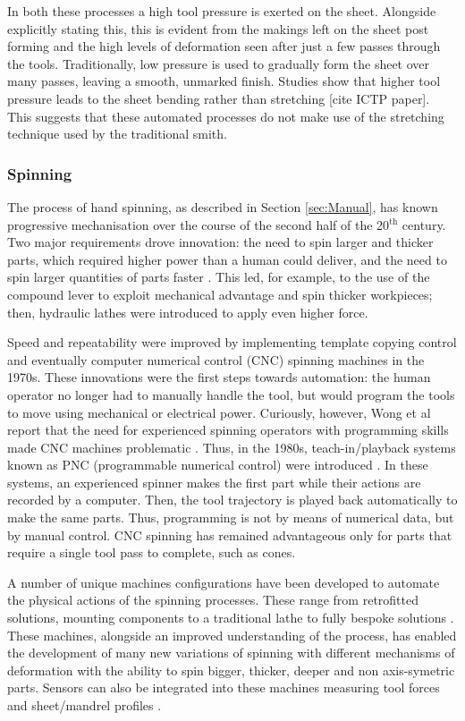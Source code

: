 In both these processes a high tool pressure is exerted on the sheet. Alongside explicitly stating this, this is evident from the makings left on the sheet post forming and the high levels of deformation seen after just a few passes through the tools. Traditionally, low pressure is used to gradually form the sheet over many passes, leaving a smooth, unmarked finish. Studies show that higher tool pressure leads to the sheet bending rather than stretching [cite ICTP paper]. This suggests that these automated processes do not make use of the stretching technique used by the traditional smith.


\subsubsection*{Spinning}

The process of hand spinning, as described in Section \ref{sec:Manual}, has known progressive mechanisation over the course of the second half of the 20$^{\text{th}}$ century. Two major requirements drove innovation: the need to spin larger and thicker parts, which required higher power than a human could deliver, and the need to spin larger quantities of parts faster \citep{Wong2003AProcesses}. This led, for example, to the use of the compound lever to exploit mechanical advantage and spin thicker workpieces; then, hydraulic lathes were introduced to apply even higher force. 

Speed and repeatability were improved by implementing template copying control and eventually computer numerical control (CNC) spinning machines in the 1970s. These innovations were the first steps towards automation: the human operator no longer had to manually handle the tool, but would program the tools to move using mechanical or electrical power. Curiously, however, Wong et al report that the need for experienced spinning operators with programming skills made CNC machines problematic \citep{Wong2003AProcesses}. Thus, in the 1980s, teach-in/playback systems known as PNC (programmable numerical control) were introduced \citep{Lloyd1986AnProspective}. In these systems, an experienced spinner makes the first part while their actions are recorded by a computer. Then, the tool trajectory is played back automatically to make the same parts. Thus, programming is not by means of numerical data, but by manual control. CNC spinning has remained advantageous only for parts that require a single tool pass to complete, such as cones. 

A number of unique machines configurations have been developed to automate the physical actions of the spinning processes. These range from retrofitted solutions, mounting components to a traditional lathe \citep{Abd-Alrazzaq2019ARetrofit} to fully bespoke solutions \citep{Music2011FlexibleSpinning}. These machines, alongside an improved understanding of the process, has enabled the development of many new variations of spinning with different mechanisms of deformation \citep{Xia2014ASpinning} with the ability to spin bigger, thicker, deeper and non axis-symetric parts. Sensors can also be integrated into these machines measuring tool forces \citep{Wang2011ASpinning} and sheet/mandrel profiles \citep{Hanafi2003VisualSpinning}.

